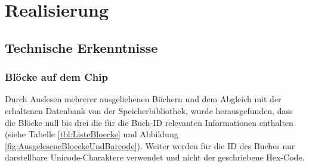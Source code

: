 \chapter{Realisierung}

\section{Technische Erkenntnisse}

\subsection{Blöcke auf dem Chip}
Durch Auslesen mehrerer ausgeliehenen Büchern und dem Abgleich mit der erhaltenen Datenbank von der Speicherbibliothek, wurde herausgefunden, dass die Blöcke null bis drei die für die Buch-ID relevanten Informationen enthalten (siehe Tabelle \ref{tbl:ListeBloecke} und Abbildung \ref{fig:AusgeleseneBloeckeUndBarcode}). Weiter werden für die ID des Buches nur darstellbare Unicode-Charaktere verwendet und nicht der geschriebene Hex-Code.


